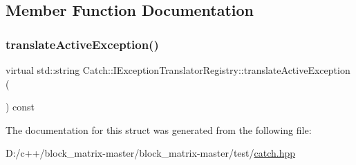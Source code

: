 \subsection{Member Function Documentation}
\mbox{\label{struct_catch_1_1_i_exception_translator_registry_af76ae8c331a17f2a94c9720bc0d686bb}} 
\subsubsection{\texorpdfstring{translate\+Active\+Exception()}{translateActiveException()}}
{\footnotesize\ttfamily virtual std\+::string Catch\+::\+I\+Exception\+Translator\+Registry\+::translate\+Active\+Exception (\begin{DoxyParamCaption}{ }\end{DoxyParamCaption}) const\hspace{0.3cm}{\ttfamily [pure virtual]}}



The documentation for this struct was generated from the following file\+:\begin{DoxyCompactItemize}
\item 
D\+:/c++/block\+\_\+matrix-\/master/block\+\_\+matrix-\/master/test/\mbox{\hyperlink{catch_8hpp}{catch.\+hpp}}\end{DoxyCompactItemize}
